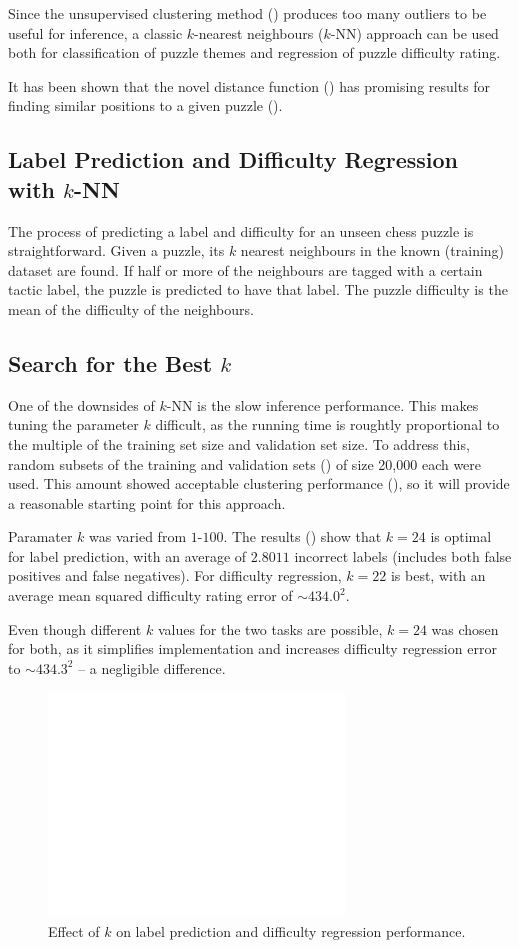 Since the unsupervised clustering method () produces too many
outliers to be useful for inference, a classic $k$-nearest neighbours ($k$-NN) approach
\citep{fix1985discriminatory} can be used both for classification of puzzle
themes and regression of puzzle difficulty rating.

It has been shown that the novel distance function () has
promising results for finding similar positions to a given puzzle
().

\subsection{Label Prediction and Difficulty Regression with $k$-NN}

The process of predicting a label and difficulty for an unseen chess puzzle is
straightforward. Given a puzzle, its $k$ nearest neighbours in the known
(training) dataset are found. If half or more of the neighbours are tagged with
a certain tactic label, the puzzle is predicted to have that label. The puzzle
difficulty is the mean of the difficulty of the neighbours.

\subsection{Search for the Best $k$}\label{treeS31}

One of the downsides of $k$-NN is the slow inference performance. This makes
tuning the parameter $k$ difficult, as the running time is roughtly
proportional to the multiple of the training set size and validation set size.
To address this, random subsets of the training and validation sets
() of size 20,000 each were used. This amount showed acceptable
clustering performance (), so it will provide a reasonable
starting point for this approach.

Paramater $k$ was varied from $1$-$100$. The results () show that
$k=24$ is optimal for label prediction, with an average of $2.8011$ incorrect
labels (includes both false positives and false negatives). For difficulty
regression, $k=22$ is best, with an average mean squared difficulty rating
error of $\sim\!434.0^2$. 

Even though different $k$ values for the two tasks are possible, $k=24$ was
chosen for both, as it simplifies implementation and increases difficulty
regression error to $\sim\!434.3^2$ -- a negligible difference. 

\begin{figure}[H]
  \centering
  \includegraphics[width=0.7\textwidth]{project/img/knn.png}
  \caption{Effect of $k$ on label prediction and difficulty regression performance.}
  \label{knn}
\end{figure}

